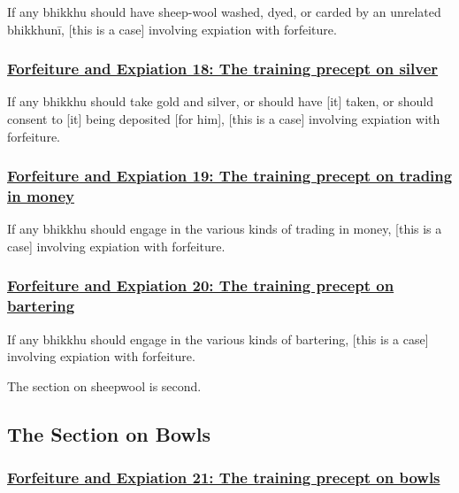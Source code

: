 If any bhikkhu should have sheep-wool washed, dyed, or carded by an unrelated bhikkhunī, [this is a case] involving expiation with forfeiture.



\subsubsection*{\hyperref[np18]{Forfeiture and Expiation 18: The training precept on silver}}
\label{forf-exp18}

If any bhikkhu should take gold and silver, or should have [it] taken, or should consent to [it] being deposited [for him], [this is a case] involving expiation with forfeiture.



\subsubsection*{\hyperref[np19]{Forfeiture and Expiation 19: The training precept on trading in money}}
\label{forf-exp19}

If any bhikkhu should engage in the various kinds of trading in money, [this is a case] involving expiation with forfeiture.



\subsubsection*{\hyperref[np20]{Forfeiture and Expiation 20: The training precept on bartering}}
\label{forf-exp20}

If any bhikkhu should engage in the various kinds of bartering, [this is a case] involving expiation with forfeiture.

\begin{center}
The section on sheepwool is second.
\end{center}



\setsubsecheadstyle{\subsectionFmt}
\subsection{The Section on Bowls}

\subsubsection*{\hyperref[np21]{Forfeiture and Expiation 21: The training precept on bowls}}
\label{forf-exp21}

